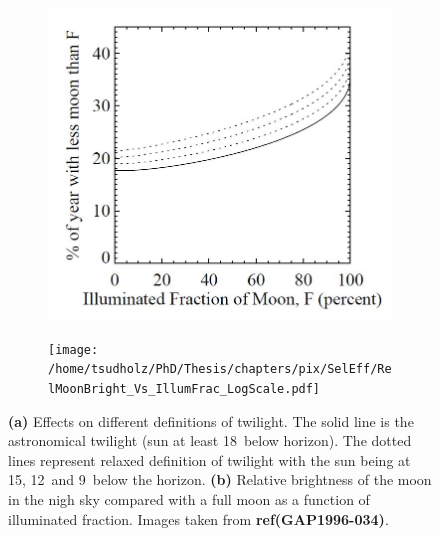 \begin{figure}
\centering
\begin{subfigure}[b]{0.32\textwidth}
\includegraphics[width=\textwidth]{chapters/pix/SelEff/IlluminatedMoonFrac_Twilight.JPG}
\caption{}\label{fig:MoonYearlyFrac}
\end{subfigure}
\hspace*{3mm}
\begin{subfigure}[b]{0.555\textwidth}
\texttt{[image: /home/tsudholz/PhD/Thesis/chapters/pix/SelEff/RelMoonBright\_Vs\_IllumFrac\_LogScale.pdf]}
\caption{}\label{fig:MoonIllumFrac}
\end{subfigure}
\caption{\textbf{(a)} Effects on different definitions of twilight. The solid line is the astronomical twilight (sun at least 18\textdegree \ below horizon). The dotted lines represent relaxed definition of twilight with the sun being at 15\textdegree , 12\textdegree \ and 9\textdegree \ below the horizon. \textbf{(b)} Relative brightness of the moon in the nigh sky compared with a full moon as a function of illuminated fraction. Images taken from \textbf{ref{(GAP1996-034)}}. } 
\end{figure}

